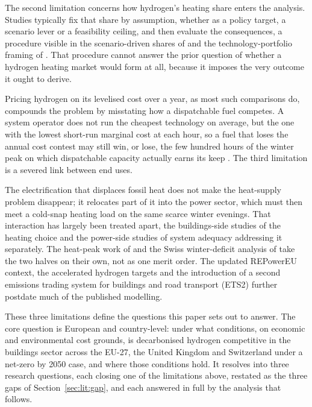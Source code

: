 The
second limitation concerns how hydrogen's heating share enters the analysis.
Studies typically fix that share by assumption, whether as a policy target, a
scenario lever or a feasibility ceiling, and then evaluate the consequences, a
procedure visible in the scenario-driven shares of \citet{Billerbeck2023Race} and
the technology-portfolio framing of \citet{Weidner2023Planetary}. That procedure
cannot answer the prior question of whether a hydrogen heating market would form at
all, because it imposes the very outcome it ought to derive.

Pricing hydrogen on its levelised cost over a year, as most such comparisons do,
compounds the problem by misstating how a dispatchable fuel competes. A system operator
does not run the cheapest technology on average, but the one with the lowest short-run
marginal cost at each hour, so a fuel that loses the annual cost contest may still win,
or lose, the few hundred hours of the winter peak on which dispatchable capacity
actually earns its keep \citep{Joskow2008capacity,Quarton2019Value}. The third
limitation is a severed link between end uses.

The electrification that displaces fossil heat does not make the heat-supply problem
disappear; it relocates part of it into the power sector, which must then meet a
cold-snap heating load on the same scarce winter evenings. That interaction has largely
been treated apart, the buildings-side studies of the heating choice and the power-side
studies of system adequacy addressing it separately. The heat-peak work of
\citet{Zeyen2021Mitigating} and the Swiss winter-deficit analysis of
\citet{Mellot2024Mitigating} take the two halves on their own, not as one merit order.
The updated REPowerEU context, the accelerated hydrogen targets and the introduction of
a second emissions trading system for buildings and road transport (ETS2) further
postdate much of the published modelling.

These three limitations define the questions this paper sets out to answer. The core
question is European and country-level: under what conditions, on economic and
environmental cost grounds, is decarbonised hydrogen competitive in the buildings sector
across the EU-27, the United Kingdom and Switzerland under a net-zero by 2050 case, and where those conditions hold. It resolves into three research questions, each closing
one of the limitations above, restated as the three gaps of Section~\ref{sec:lit:gap},
and each answered in full by the analysis that follows.

